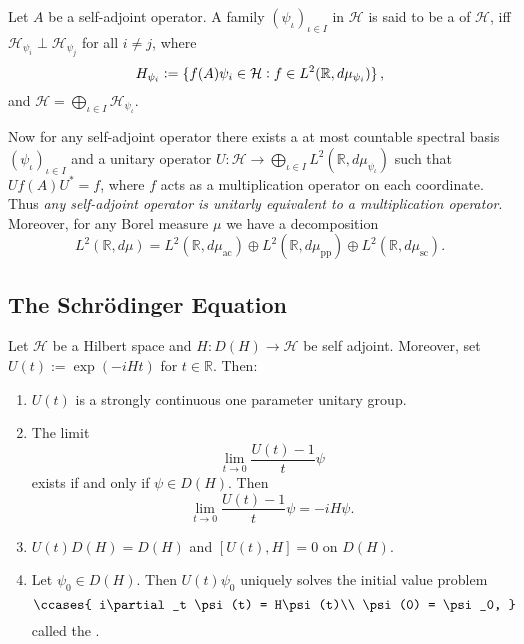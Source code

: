 \begin{definition}
	Let $A$ be a self-adjoint operator. A family $(\psi_\iota)_{\iota \in I}$ in $\mathcal{H}$ is said to be a  of $\mathcal{H}$, iff $\mathcal{H}_{\psi_i} \perp \mathcal{H}_{\psi_j}$ for all $i \neq j$, where
	\begin{equation*}
		H_{\psi_i} := \cbr[0]{f(A)\psi_i \in \mathcal{H} : f \in L^2(\mathbb{R},d\mu_{\psi_i})},
	\end{equation*}
	\noindent and $\mathcal{H} = \bigoplus_{\iota \in I} \mathcal{H}_{\psi_\iota}$.
\end{definition}

Now for any self-adjoint operator there exists a at most countable spectral basis $(\psi_\iota)_{\iota \in I}$ and a unitary operator $U : \mathcal{H} \to \bigoplus_{\iota \in I} L^2(\mathbb{R},d\mu_{\psi_\iota})$ such that $Uf(A)U^* = f$, where $f$ acts as a multiplication operator on each coordinate. Thus \emph{any self-adjoint operator is unitarly equivalent to a multiplication operator}.\\
Moreover, for any Borel measure $\mu$ we have a decomposition
\begin{equation*}
	L^2(\mathbb{R},d\mu) = L^2(\mathbb{R},d\mu_{\mathrm{ac}}) \oplus L^2(\mathbb{R},d\mu_{\mathrm{pp}}) \oplus L^2(\mathbb{R},d\mu_{\mathrm{sc}}).
\end{equation*} 

\subsection*{The Schr\"odinger Equation}

\begin{theorem}
	Let $\mathcal{H}$ be a Hilbert space and $H : D(H) \to \mathcal{H}$ be self adjoint. Moreover, set $U(t) := \exp(-iHt)$ for $t \in \mathbb{R}$. Then:
	\begin{enumerate}[label=\textup{(}\alph*\textup{)},wide=0pt]
		\item $U(t)$ is a strongly continuous one parameter unitary group.
		\item The limit
			\begin{equation*}
				\lim_{t \to 0} \frac{U(t) - 1}{t}\psi
			\end{equation*}
			\noindent exists if and only if $\psi \in D(H)$. Then
			\begin{equation*}
				\lim_{t \to 0} \frac{U(t) - 1}{t}\psi = -iH\psi.
			\end{equation*}
		\item $U(t)D(H) = D(H)$ and $[U(t),H] = 0$ on $D(H)$.
		\item Let $\psi_0 \in D(H)$. Then $U(t)\psi_0$ uniquely solves the initial value problem
			\begin{equation}
				\ccases{
					i\partial_t \psi(t) = H\psi(t)\\
					\psi(0) = \psi_0,
				}
			\end{equation}
			\noindent called the .
	\end{enumerate}
\end{theorem}
